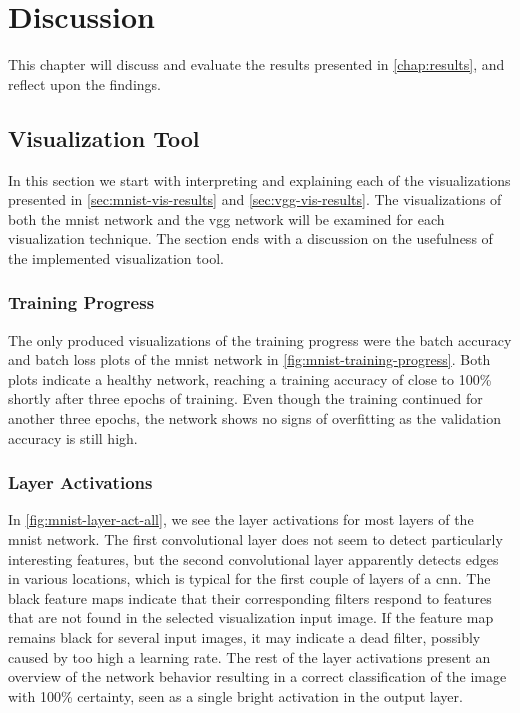 
\chapter{Discussion} \label{chap:discussion}

This chapter will discuss and evaluate the results presented in \autoref{chap:results}, and reflect upon the findings.

\section{Visualization Tool}

In this section we start with interpreting and explaining each of the visualizations presented in \autoref{sec:mnist-vis-results} and \autoref{sec:vgg-vis-results}. The visualizations of both the \acrshort{mnist} network and the \acrshort{vgg} network will be examined for each visualization technique. The section ends with a discussion on the usefulness of the implemented visualization tool.

\subsection{Training Progress}

The only produced visualizations of the training progress were the batch accuracy and batch loss plots of the \acrshort{mnist} network in \autoref{fig:mnist-training-progress}. Both plots indicate a healthy network, reaching a training accuracy of close to 100\% shortly after three epochs of training. Even though the training continued for another three epochs, the network shows no signs of overfitting as the validation accuracy is still high.

\subsection{Layer Activations}

In \autoref{fig:mnist-layer-act-all}, we see the layer activations for most layers of the \acrshort{mnist} network. The first convolutional layer does not seem to detect particularly interesting features, but the second convolutional layer apparently detects edges in various locations, which is typical for the first couple of layers of a \acrshort{cnn}. The black feature maps indicate that their corresponding filters respond to features that are not found in the selected visualization input image. If the feature map remains black for several input images, it may indicate a dead filter, possibly caused by too high a learning rate. The rest of the layer activations present an overview of the network behavior resulting in a correct classification of the image with 100\% certainty, seen as a single bright activation in the output layer. \\

